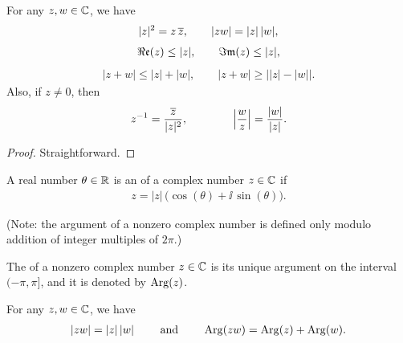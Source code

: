 \begin{lemma}
  \label{lem:absolute_value_properties}
  For any $z, w \in \mathbb{C}$, we have
  \begin{align*}
    |z|^2 = z \, \overline{z} , \qquad
    |z w| = |z| \, |w| ,
  \end{align*}
  \begin{align*}
    \Re\mathfrak{e}(z) \le |z| , \qquad
    \Im\mathfrak{m}(z) \le |z| ,
  \end{align*}
  \begin{align*}
    |z + w| \le |z| + |w| , \qquad
    |z + w| \ge \big| |z| - |w| \big| .
  \end{align*}
  Also, if $z \ne 0$, then
  \begin{align*}
    z^{-1} = \frac{\overline{z}}{|z|^2} , \qquad
    \qquad
    \Big| \frac{w}{z} \Big| = \frac{|w|}{|z|} .
  \end{align*}
\end{lemma}
\begin{proof}
  Straightforward.
\end{proof}

\begin{definition}
  \label{def:argument}
  A real number $\theta \in \mathbb{R}$ is an  of a complex
  number $z \in \mathbb{C}$ if
  \begin{align*}
    z = |z| \, \Big( \cos (\theta) + \ii \, \sin (\theta) \Big) .
  \end{align*}

  (Note: the argument of a nonzero complex number is defined only
  modulo addition of integer multiples of $2 \pi$.)

  The  of a nonzero complex number $z \in \mathbb{C}$
  is its unique argument on the interval $(-\pi, \pi]$, and it is denoted
  by $\mathrm{Arg}(z)$.
\end{definition}

\begin{lemma}
  \label{lem:multiplication_polar}
  For any $z,w \in \mathbb{C}$, we have
  \begin{align*}
    |zw| = |z| \, |w|
    \qquad \text{ and } \qquad
    \mathrm{Arg}(zw) = \mathrm{Arg}(z) + \mathrm{Arg}(w) .
  \end{align*}
\end{lemma}

